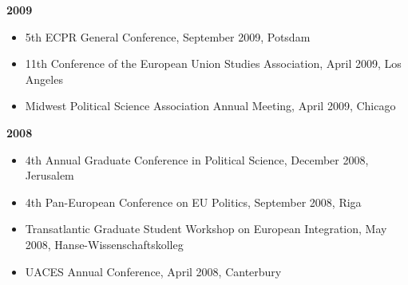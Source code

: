 \vspace{\baselineskip}

\textbf{2009}
\begin{itemize}[topsep=0pt, noitemsep, leftmargin=3]
	\item 5th ECPR General Conference, September 2009, Potsdam
	\item 11th Conference of the European Union Studies Association, April 2009, Los Angeles
	\item Midwest Political Science Association Annual Meeting, April 2009, Chicago
\end{itemize}

\vspace{\baselineskip}

\textbf{2008}
\begin{itemize}[topsep=0pt, noitemsep, leftmargin=3]
	\item 4th Annual Graduate Conference in Political Science, December 2008, Jerusalem
	\item 4th Pan-European Conference on EU Politics, September 2008, Riga
	\item Transatlantic Graduate Student Workshop on European Integration, May 2008, Hanse-Wissenschaftskolleg
	\item UACES Annual Conference, April 2008, Canterbury
\end{itemize}

